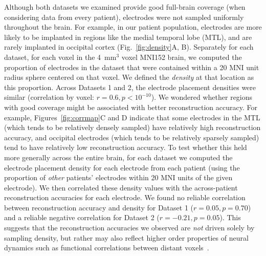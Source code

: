 \documentclass[11pt]{article}
\begin{document}
Although both datasets we examined provide good full-brain coverage (when
considering data from every patient), electrodes were not sampled uniformly
throughout the brain.  For example, in our patient population, electrodes are
more likely to be implanted in regions like the medial temporal lobe (MTL), and
are rarely implanted in occipital cortex (Fig.~\ref{fig:density}A, B).
Separately for each dataset, for each voxel in the 4~mm$^3$ voxel MNI152 brain,
we computed the proportion of electrodes in the dataset that were contained
within a 20 MNI unit radius sphere centered on that voxel.  We defined the
\textit{density} at that location as this proportion. Across Datasets 1 and 2,
the electrode placement densities were similar (correlation by voxel: $r = 0.6,
p < 10^{-10}$).  We wondered whether regions with good coverage might be
associated with better reconstruction accuracy. For example,
Figures~\ref{fig:corrmap}C and D indicate that some electrodes in the MTL (which
tends to be relatively densely sampled) have relatively high reconstruction
accuracy, and occipital electrodes (which tends to be relatively sparsely
sampled) tend to have relatively low reconstruction accuracy.  To test whether
this held more generally across the entire brain, for each dataset we computed
the electrode placement density for each electrode from each patient (using the
proportion of \textit{other} patients' electrodes within 20 MNI units of the
given electrode).  We then correlated these density values with the
across-patient reconstruction accuracies for each electrode.  We found no
reliable correlation between reconstruction accuracy and density for Dataset 1
($r = 0.05, p = 0.70$) and a reliable negative correlation for Dataset 2 ($r =
-0.21, p = 0.05$).  This suggests that the reconstruction accuracies we
observed are \textit{not} driven solely by sampling density, but rather may also
reflect higher order properties of neural dynamics such as functional
correlations between distant voxels~\citep{BetzEtal17b}.
\end{document}
